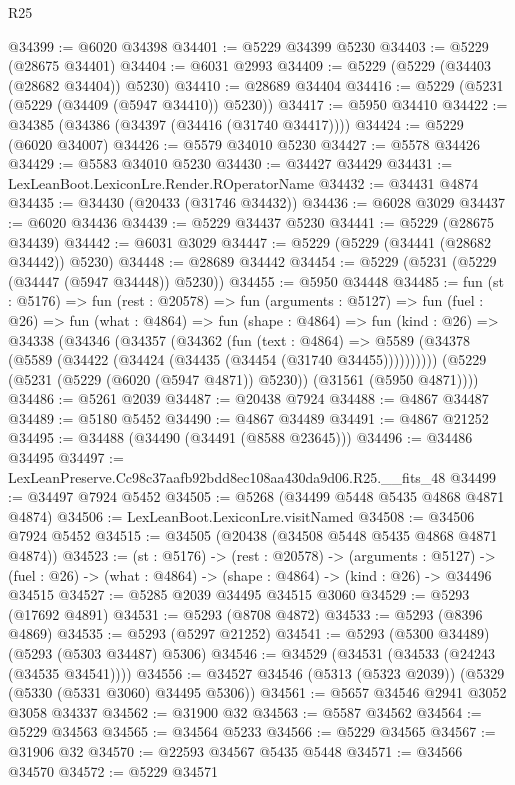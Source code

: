\begin{lexlean}{R25}
\begin{coremodule}
@34399 := @6020 @34398
@34401 := @5229 @34399 @5230
@34403 := @5229 (@28675 @34401)
@34404 := @6031 @2993
@34409 := @5229 (@5229 (@34403 (@28682 @34404)) @5230)
@34410 := @28689 @34404
@34416 := @5229 (@5231 (@5229 (@34409 (@5947 @34410)) @5230))
@34417 := @5950 @34410
@34422 := @34385 (@34386 (@34397 (@34416 (@31740 @34417))))
@34424 := @5229 (@6020 @34007)
@34426 := @5579 @34010 @5230
@34427 := @5578 @34426
@34429 := @5583 @34010 @5230
@34430 := @34427 @34429
@34431 := LexLeanBoot.LexiconLre.Render.ROperatorName
@34432 := @34431 @4874
@34435 := @34430 (@20433 (@31746 @34432))
@34436 := @6028 @3029
@34437 := @6020 @34436
@34439 := @5229 @34437 @5230
@34441 := @5229 (@28675 @34439)
@34442 := @6031 @3029
@34447 := @5229 (@5229 (@34441 (@28682 @34442)) @5230)
@34448 := @28689 @34442
@34454 := @5229 (@5231 (@5229 (@34447 (@5947 @34448)) @5230))
@34455 := @5950 @34448
@34485 := fun (st : @5176) =>
  fun (rest : @20578) =>
  fun (arguments : @5127) =>
  fun (fuel : @26) =>
  fun (what : @4864) =>
  fun (shape : @4864) =>
  fun (kind : @26) =>
  @34338
    (@34346
      (@34357
        (@34362
          (fun (text : @4864) =>
          @5589 (@34378 (@5589 (@34422 (@34424 (@34435 (@34454 (@31740 @34455))))))))))
      (@5229 (@5231 (@5229 (@6020 (@5947 @4871)) @5230)) (@31561 (@5950 @4871))))
@34486 := @5261 @2039
@34487 := @20438 @7924
@34488 := @4867 @34487
@34489 := @5180 @5452
@34490 := @4867 @34489
@34491 := @4867 @21252
@34495 := @34488 (@34490 (@34491 (@8588 @23645)))
@34496 := @34486 @34495
@34497 := LexLeanPreserve.Cc98c37aafb92bdd8ec108aa430da9d06.R25.__fits_48
@34499 := @34497 @7924 @5452
@34505 := @5268 (@34499 @5448 @5435 @4868 @4871 @4874)
@34506 := LexLeanBoot.LexiconLre.visitNamed
@34508 := @34506 @7924 @5452
@34515 := @34505 (@20438 (@34508 @5448 @5435 @4868 @4871 @4874))
@34523 := (st : @5176) ->
  (rest : @20578) ->
  (arguments : @5127) ->
  (fuel : @26) -> (what : @4864) -> (shape : @4864) -> (kind : @26) -> @34496 @34515
@34527 := @5285 @2039 @34495 @34515 @3060
@34529 := @5293 (@17692 @4891)
@34531 := @5293 (@8708 @4872)
@34533 := @5293 (@8396 @4869)
@34535 := @5293 (@5297 @21252)
@34541 := @5293 (@5300 @34489) (@5293 (@5303 @34487) @5306)
@34546 := @34529 (@34531 (@34533 (@24243 (@34535 @34541))))
@34556 := @34527 @34546 (@5313 (@5323 @2039)) (@5329 (@5330 (@5331 @3060) @34495 @5306))
@34561 := @5657 @34546 @2941 @3052 @3058 @34337
@34562 := @31900 @32
@34563 := @5587 @34562
@34564 := @5229 @34563
@34565 := @34564 @5233
@34566 := @5229 @34565
@34567 := @31906 @32
@34570 := @22593 @34567 @5435 @5448
@34571 := @34566 @34570
@34572 := @5229 @34571

\end{coremodule}
\end{lexlean}
